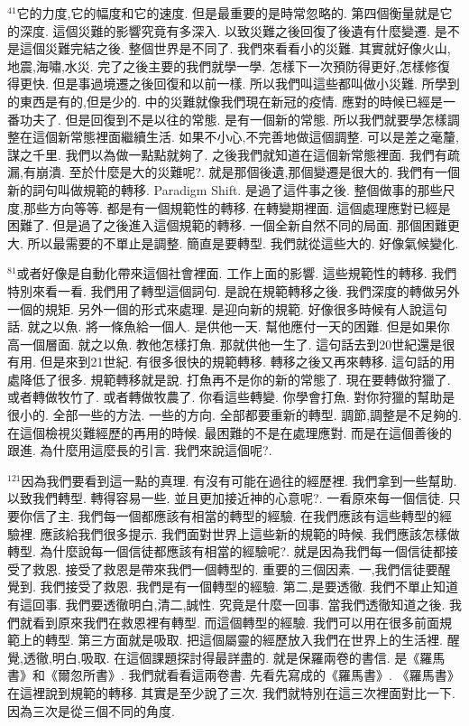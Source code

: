 \documentclass{book}
\begin{document}
$^{41}$它的力度,它的幅度和它的速度.
但是最重要的是時常忽略的.
第四個衡量就是它的深度.
這個災難的影響究竟有多深入.
以致災難之後回復了後遺有什麼變遷.
是不是這個災難完結之後.
整個世界是不同了.
我們來看看小的災難.
其實就好像火山,地震,海嘯,水災.
完了之後主要的我們就學一學.
怎樣下一次預防得更好,怎樣修復得更快.
但是事過境遷之後回復和以前一樣.
所以我們叫這些都叫做小災難.
所學到的東西是有的,但是少的.
中的災難就像我們現在新冠的疫情.
應對的時候已經是一番功夫了.
但是回復到不是以往的常態.
是有一個新的常態.
所以我們就要學怎樣調整在這個新常態裡面繼續生活.
如果不小心,不完善地做這個調整.
可以是差之毫釐,謀之千里.
我們以為做一點點就夠了.
之後我們就知道在這個新常態裡面.
我們有疏漏,有崩潰.
至於什麼是大的災難呢?.
就是那個後遺,那個變遷是很大的.
我們有一個新的詞句叫做規範的轉移.
Paradigm Shift.
是過了這件事之後.
整個做事的那些尺度,那些方向等等.
都是有一個規範性的轉移.
在轉變期裡面.
這個處理應對已經是困難了.
但是過了之後進入這個規範的轉移.
一個全新自然不同的局面.
那個困難更大.
所以最需要的不單止是調整.
簡直是要轉型.
我們就從這些大的.
好像氣候變化.

$^{81}$或者好像是自動化帶來這個社會裡面.
工作上面的影響.
這些規範性的轉移.
我們特別來看一看.
我們用了轉型這個詞句.
是說在規範轉移之後.
我們深度的轉做另外一個的規矩.
另外一個的形式來處理.
是迎向新的規範.
好像很多時候有人說這句話.
就之以魚.
將一條魚給一個人.
是供他一天.
幫他應付一天的困難.
但是如果你高一個層面.
就之以魚.
教他怎樣打魚.
那就供他一生了.
這句話去到20世紀還是很有用.
但是來到21世紀.
有很多很快的規範轉移.
轉移之後又再來轉移.
這句話的用處降低了很多.
規範轉移就是說.
打魚再不是你的新的常態了.
現在要轉做狩獵了.
或者轉做牧竹了.
或者轉做牧農了.
你看這些轉變.
你學會打魚.
對你狩獵的幫助是很小的.
全部一些的方法.
一些的方向.
全部都要重新的轉型.
調節,調整是不足夠的.
在這個檢視災難經歷的再用的時候.
最困難的不是在處理應對.
而是在這個善後的跟進.
為什麼用這麼長的引言.
我們來說這個呢?.

$^{121}$因為我們要看到這一點的真理.
有沒有可能在過往的經歷裡.
我們拿到一些幫助.
以致我們轉型.
轉得容易一些.
並且更加接近神的心意呢?.
一看原來每一個信徒.
只要你信了主.
我們每一個都應該有相當的轉型的經驗.
在我們應該有這些轉型的經驗裡.
應該給我們很多提示.
我們面對世界上這些新的規範的時候.
我們應該怎樣做轉型.
為什麼說每一個信徒都應該有相當的經驗呢?.
就是因為我們每一個信徒都接受了救恩.
接受了救恩是帶來我們一個轉型的.
重要的三個因素.
一,我們信徒要醒覺到.
我們接受了救恩.
我們是有一個轉型的經驗.
第二,是要透徹.
我們不單止知道有這回事.
我們要透徹明白,清二,誠性.
究竟是什麼一回事.
當我們透徹知道之後.
我們就看到原來我們在救恩裡有轉型.
而這個轉型的經驗.
我們可以用在很多前面規範上的轉型.
第三方面就是吸取.
把這個屬靈的經歷放入我們在世界上的生活裡.
醒覺,透徹,明白,吸取.
在這個課題探討得最詳盡的.
就是保羅兩卷的書信.
是《羅馬書》和《爾忽所書》.
我們就看看這兩卷書.
先看先寫成的《羅馬書》.
《羅馬書》在這裡說到規範的轉移.
其實是至少說了三次.
我們就特別在這三次裡面對比一下.
因為三次是從三個不同的角度.
\end{document}

